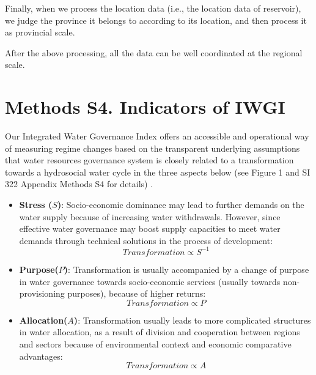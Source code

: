 \documentclass[9pt,twoside,lineno]{pnas-new}
\begin{document}
Finally, when we process the location data (i.e., the location data of reservoir), we judge the province it belongs to according to its location, and then process it as provincial scale.

After the above processing, all the data can be well coordinated at the regional scale.

\newpage
\section*{Methods S4. Indicators of IWGI}

Our Integrated Water Governance Index offers an accessible and operational way of measuring regime changes based on the transparent underlying assumptions that water resources governance system is closely related to a transformation towards a hydrosocial water cycle in the three aspects below (see Figure 1 and SI 322 Appendix Methods S4 for details)
\cite{abbottwatercycleAnthropocene2019,leviaHomogenizationterrestrialwater2020,steffenTrajectoriesEarthSystem2018}.

\begin{itemize}
    \item \textbf{Stress ($S$)}: Socio-economic dominance may lead to further demands on the water supply because of increasing water withdrawals. However, since effective water governance may boost supply capacities to meet water demands through technical solutions in the process of development:
    \begin{equation}
        Transformation \propto S^{-1}
    \end{equation}


    \item \textbf{Purpose($P$)}: Transformation is usually accompanied by a change of purpose in water governance towards socio-economic services (usually towards non-provisioning purposes), because of higher returns:
    \begin{equation}
        Transformation \propto P
    \end{equation}

    \item \textbf{Allocation($A$)}: Transformation usually leads to more complicated structures in water allocation, as a result of division and cooperation between regions and sectors because of environmental context and economic comparative advantages:
    \begin{equation}
        Transformation \propto A
    \end{equation}

\end{itemize}
\end{document}
